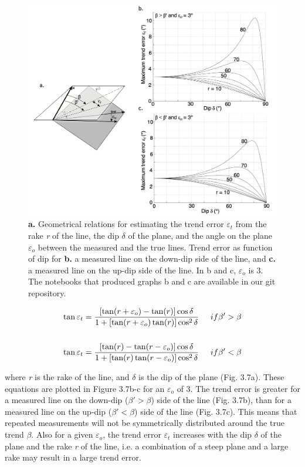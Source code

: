 \documentclass[a4paper , 12pt]{book}
\begin{document}
\begin{figure}[ht]
    \centering
    \includegraphics[width=13cm]{Figures/ch3f7.png}
    \caption{\textbf{a.} Geometrical relations for estimating the trend error $\varepsilon_t$ from the rake \textit{r} of the line, the dip $\delta$  of the plane, and the angle on the plane $\varepsilon_o$ between the measured and the true lines. Trend error as function of dip for \textbf{b.} a measured line on the down-dip side of the line, and \textbf{c.} a measured line on the up-dip side of the line. In b and c, $\varepsilon_o$ is 3\degree. The notebooks that produced graphs b and c are available in our git repository.}
\end{figure}

\begin{equation}
    \begin{split}
        \tan\varepsilon_t = \frac{[\tan(r+\varepsilon_o)-\tan(r)]\cos\delta}{1+[\tan(r+\varepsilon_o)\tan(r)]\cos^2\delta} \hspace{0.5cm} if \beta\text{$'$}>\beta\\ \\
        \tan\varepsilon_t = \frac{[\tan(r)-\tan(r-\varepsilon_o)]\cos\delta}{1+[\tan(r)\tan(r-\varepsilon_o)]\cos^2\delta} \hspace{0.5cm} if \beta\text{$'$}<\beta
    \end{split}
\end{equation}

where \textit{r} is the rake of the line, and $\delta$ is the dip of the plane (Fig. 3.7a). These equations are plotted in Figure 3.7b-c for an $\varepsilon_o$ of 3\degree. The trend error is greater for a measured line on the down-dip ($\beta\text{$'$} > \beta$) side of the line (Fig. 3.7b), than for a measured line on the up-dip ($\beta\text{$'$} < \beta$) side of the line (Fig. 3.7c). This means that repeated measurements will not be symmetrically distributed around the true trend $\beta$. Also for a given $\varepsilon_o$, the trend error $\varepsilon_t$ increases with the dip $\delta$ of the plane and the rake \textit{r} of the line, i.e. a combination of a steep plane and a large rake may result in a large trend error.
\end{document}
